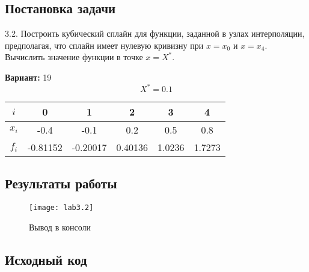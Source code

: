 \subsection{Постановка задачи}
3.2. Построить кубический сплайн для функции, заданной в узлах интерполяции, предполагая, что сплайн имеет нулевую кривизну при $x=x_0$ и $x=x_4$. Вычислить значение функции в точке $x=X^*$.

{\bfseries Вариант:} 19
    \begin{equation}
		X^*=0.1
    \end{equation}
    \begin{center}
        \begin{tabular}{ |c|c|c|c|c|c| } 
			 \hline
			 $i$ & 0 & 1 & 2 & 3 & 4 \\ 
			 \hline
			 $x_i$ & -0.4 & -0.1 & 0.2 & 0.5 & 0.8 \\ 
			 \hline
			 $f_i$ & -0.81152 & -0.20017 & 0.40136 & 1.0236 & 1.7273 \\ 
			 \hline
        \end{tabular}
    \end{center}
\pagebreak

\subsection{Результаты работы}
\begin{figure}[h!]
\centering
\texttt{[image: lab3.2]}
\caption{Вывод в консоли}
\end{figure}


\subsection{Исходный код}

\pagebreak


